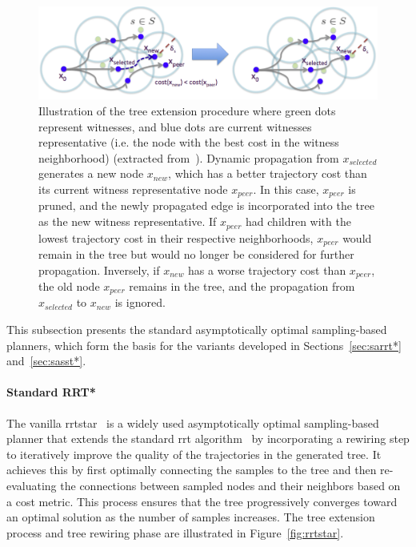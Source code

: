 \begin{figure} [h!]
    \centering
    \includegraphics[width=0.95\linewidth]{figures/samp/sst.png} 
    \caption{Illustration of the  tree extension procedure where green dots represent witnesses, and blue dots are current witnesses representative (i.e. the node with the best cost in the witness neighborhood) (extracted from~\cite{cSST}).
    Dynamic propagation from $x_{selected}$ generates a new node $x_{new}$, which has a better trajectory cost than its current witness representative node $x_{peer}$.
    In this case, $x_{peer}$ is pruned, and the newly propagated edge is incorporated into the tree as the new witness representative.
    If $x_{peer}$ had children with the lowest trajectory cost in their respective neighborhoods, $x_{peer}$ would remain in the tree but would no longer be considered for further propagation. 
    Inversely, if $x_{new}$ has a worse trajectory cost than $x_{peer}$, the old node $x_{peer}$ remains in the tree, and the propagation from $x_{selected}$ to $x_{new}$ is ignored.}%
    \label{fig:sst}%
\end{figure}

This subsection presents the standard asymptotically optimal sampling-based planners, which form the basis for the  variants developed in Sections~\ref{sec:sarrt*} and~\ref{sec:sasst*}.

\paragraph{Standard RRT*}

The vanilla \gls{rrtstar}~\cite{cRRTstar} is a widely used asymptotically optimal sampling-based planner that extends the standard \gls{rrt} algorithm~\cite{cRRT} by incorporating a rewiring step to iteratively improve the quality of the trajectories in the generated tree.
It achieves this by first optimally connecting the samples to the tree and then re-evaluating the connections between sampled nodes and their neighbors based on a cost metric. 
This process ensures that the tree progressively converges toward an optimal solution as the number of samples increases.
The  tree extension process and tree rewiring phase are illustrated in Figure~\ref{fig:rrtstar}.

